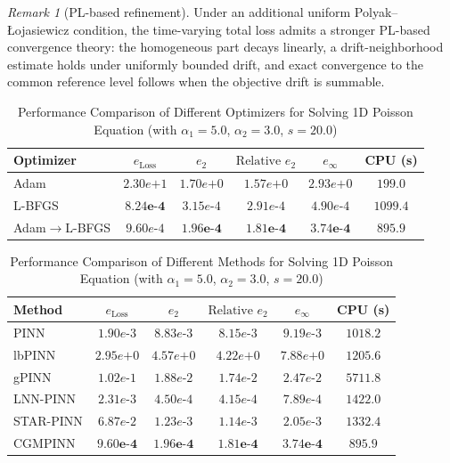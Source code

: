 \documentclass{article}
\theoremstyle{plain}
\theoremstyle{definition}
\theoremstyle{remark}
\newtheorem{remark}[theorem]{Remark}
\begin{document}
\begin{remark}[PL-based refinement]
	\label{rem:main_PL}
	Under an additional uniform Polyak--\L{}ojasiewicz condition, the
	time-varying total loss admits a stronger PL-based convergence theory:
	the homogeneous part decays linearly, a drift-neighborhood estimate
	holds under uniformly bounded drift, and exact convergence to the
	common reference level follows when the objective drift is summable.
\end{remark}

\begin{table}[t]
	\centering
	\caption{Performance Comparison of Different Optimizers for Solving 1D Poisson Equation (with $\alpha_1 = 5.0$, $\alpha_2 = 3.0$, $s = 20.0$)}
	\label{tab:poisson_optimizer_performance}
	\begin{tabular}{lccccc}
		\toprule
		Optimizer & $e_{\text{Loss}}$ & $e_2$ & $\text{Relative } e_2$ & $e_\infty$ & CPU (s) \\
		\midrule
		Adam               & $2.30e\text{+}1$ & $1.70e\text{+}0$ & $1.57e\text{+}0$ & $2.93e\text{+}0$ & $199.0$   \\
		L-BFGS             & $\mathbf{8.24e\text{-}4}$ & $3.15e\text{-}4$ & $2.91e\text{-}4$ & $4.90e\text{-}4$ & $1099.4$  \\
		Adam$\to$L-BFGS    & $9.60e\text{-}4$ & $\mathbf{1.96e\text{-}4}$ & $\mathbf{1.81e\text{-}4}$ & $\mathbf{3.74e\text{-}4}$ & $895.9$   \\
		\bottomrule
	\end{tabular}
\end{table}

\begin{table}[t]
	\centering
	\caption{Performance Comparison of Different Methods for Solving 1D Poisson Equation (with $\alpha_1 = 5.0$, $\alpha_2 = 3.0$, $s = 20.0$)}
	\label{tab:1d_poisson_pinn_methods_performance}
	\begin{tabular}{lccccc}
		\toprule
		Method & $e_{\text{Loss}}$ & $e_2$ & $\text{Relative } e_2$ & $e_\infty$ & CPU (s) \\
		\midrule
		PINN               & $1.90e\text{-}3$ & $8.83e\text{-}3$ & $8.15e\text{-}3$ & $9.19e\text{-}3$ & $1018.2$   \\
		lbPINN             & $2.95e\text{+}0$ & $4.57e\text{+}0$ & $4.22e\text{+}0$ & $7.88e\text{+}0$ & $1205.6$   \\
		gPINN              & $1.02e\text{-}1$ & $1.88e\text{-}2$ & $1.74e\text{-}2$ & $2.47e\text{-}2$ & $5711.8$   \\
		LNN-PINN           & $2.31e\text{-}3$ & $4.50e\text{-}4$ & $4.15e\text{-}4$ & $7.89e\text{-}4$ & $1422.0$   \\
		STAR-PINN          & $6.87e\text{-}2$ & $1.23e\text{-}3$ & $1.14e\text{-}3$ & $2.05e\text{-}3$ & $1332.4$   \\
		CGMPINN            & $\mathbf{9.60e\text{-}4}$ & $\mathbf{1.96e\text{-}4}$ & $\mathbf{1.81e\text{-}4}$ & $\mathbf{3.74e\text{-}4}$ & $895.9$   \\
		\bottomrule
	\end{tabular}
\end{table}
\end{document}
